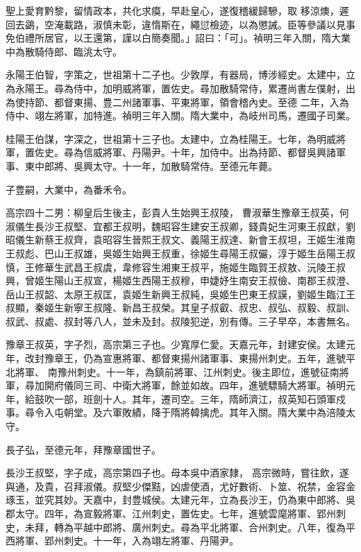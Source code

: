 \begin{pinyinscope}
 聖上愛育黔黎，留情政本，共化求瘼，早赴皇心，遂復稽緩歸驂，取
 移涼燠，遲回去鷁，空淹載路，淑慎未彰，違惰斯在，繩愆檢迹，以為懲誡。臣等參議以見事免伯禮所居官，以王還第，謹以白簡奏聞。」詔曰：「可」。禎明三年入關，隋大業中為散騎侍郎、臨洮太守。



 永陽王伯智，字策之，世祖第十二子也。少敦厚，有器局，博涉經史。太建中，立為永陽王。尋為侍中，加明威將軍，置佐史。尋加散騎常侍，累遷尚書左僕射，出為使持節、都督東揚、豊二州諸軍事、平東將軍，領會稽內史。至德
 二年，入為侍中、翊左將軍，加特進。禎明三年入關。隋大業中，為岐州司馬，遷國子司業。



 桂陽王伯謀，字深之，世祖第十三子也。太建中，立為桂陽王。七年，為明威將軍，置佐史。尋為信威將軍、丹陽尹。十年，加侍中。出為持節、都督吳興諸軍事、東中郎將、吳興太守。十一年，加散騎常侍。至德元年薨。



 子豊嗣，大業中，為番禾令。



 高宗四十二男：柳皇后生後主，彭貴人生始興王叔陵，
 曹淑華生豫章王叔英，何淑儀生長沙王叔堅、宜都王叔明，魏昭容生建安王叔卿，錢貴妃生河東王叔獻，劉昭儀生新蔡王叔齊，袁昭容生晉熙王叔文、義陽王叔達、新會王叔坦，王姬生淮南王叔彪、巴山王叔雄，吳姬生始興王叔重，徐姬生尋陽王叔儼，淳于姬生岳陽王叔慎，王修華生武昌王叔虞，韋修容生湘東王叔平，施姬生臨賀王叔敖、沅陵王叔興，曾姬生陽山王叔宣，楊姬生西陽王叔穆，申婕妤生南安王叔儉、南郡王叔澄、
 岳山王叔韶、太原王叔匡，袁姬生新興王叔純，吳姬生巴東王叔謨，劉姬生臨江王叔顯，秦姬生新寧王叔隆、新昌王叔榮。其皇子叔叡、叔忠、叔弘、叔毅、叔訓、叔武、叔處、叔封等八人，並未及封。叔陵犯逆，別有傳。三子早卒，本書無名。



 豫章王叔英，字子烈，高宗第三子也。少寬厚仁愛。天嘉元年，封建安侯。太建元年，改封豫章王，仍為宣惠將軍、都督東揚州諸軍事、東揚州刺史。五年，進號平北將軍、
 南豫州刺史。十一年，為鎮前將軍、江州刺史。後主即位，進號征南將軍，尋加開府儀同三司、中衛大將軍，餘並如故。四年，進號驃騎大將軍。禎明元年，給鼓吹一部，班劍十人。其年，遷司空。三年，隋師濟江，叔英知石頭軍戍事。尋令入屯朝堂。及六軍敗績，降于隋將韓擒虎。其年入關。隋大業中為涪陵太守。



 長子弘，至德元年，拜豫章國世子。



 長沙王叔堅，字子成，高宗第四子也。母本吳中酒家隸，
 高宗微時，嘗往飲，遂與通，及貴，召拜淑儀。叔堅少傑黠，凶虐使酒，尤好數術、卜筮、祝禁，金容金琢玉，並究其妙。天嘉中，封豊城侯。太建元年，立為長沙王，仍為東中郎將、吳郡太守。四年，為宣毅將軍、江州刺史，置佐史。七年，進號雲麾將軍、郢州刺史，未拜，轉為平越中郎將、廣州刺史。尋為平北將軍、合州刺史。八年，復為平西將軍、郢州刺史。十一年，入為翊左將軍、丹陽尹。




\end{pinyinscope}
